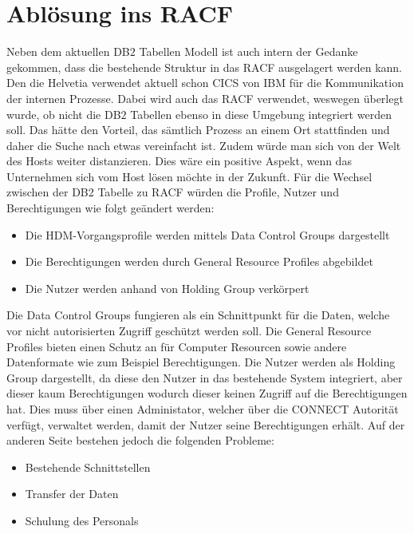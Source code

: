 \section{Ablösung ins RACF}
\label{sec:chapter05:racF}
Neben dem aktuellen DB$2$ Tabellen Modell ist auch intern der Gedanke gekommen, dass die bestehende Struktur in das \ac{RACF} ausgelagert werden kann.
Den die Helvetia verwendet aktuell schon \ac{CICS} von IBM für die Kommunikation der internen Prozesse.
Dabei wird auch das \ac{RACF} verwendet, weswegen überlegt wurde, ob nicht die DB$2$ Tabellen ebenso in diese Umgebung integriert werden soll.
Das hätte den Vorteil, das sämtlich Prozess an einem Ort stattfinden und daher die Suche nach etwas vereinfacht ist.
Zudem würde man sich von der Welt des Hosts weiter distanzieren.
Dies wäre ein positive Aspekt, wenn das Unternehmen sich vom Host lösen möchte in der Zukunft.
\newline
\newline
Für die Wechsel zwischen der DB2 Tabelle zu \ac{RACF} würden die Profile, Nutzer und Berechtigungen wie folgt geändert werden:
\begin{itemize}
	\item Die HDM-Vorgangsprofile werden mittels Data Control Groups dargestellt
	\item Die Berechtigungen werden durch General Resource Profiles abgebildet
	\item Die Nutzer werden anhand von Holding Group verkörpert
\end{itemize}
Die Data Control Groups fungieren als ein Schnittpunkt für die Daten, welche vor nicht autorisierten Zugriff geschützt werden soll. \cite{IBMdcg}
Die General Resource Profiles bieten einen Schutz an für Computer Resourcen sowie andere Datenformate wie zum Beispiel Berechtigungen. \cite{IBMgrp}
Die Nutzer werden als Holding Group dargestellt, da diese den Nutzer in das bestehende System integriert, aber dieser kaum Berechtigungen wodurch dieser keinen Zugriff auf die Berechtigungen hat.
Dies muss über einen Administator, welcher über die CONNECT Autorität verfügt, verwaltet werden, damit der Nutzer seine Berechtigungen erhält. \cite{IBMhg}
\newline
\newline
Auf der anderen Seite bestehen jedoch die folgenden Probleme:
\begin{itemize}
	\item Bestehende Schnittstellen
	\item Transfer der Daten
	\item Schulung des Personals
\end{itemize}
